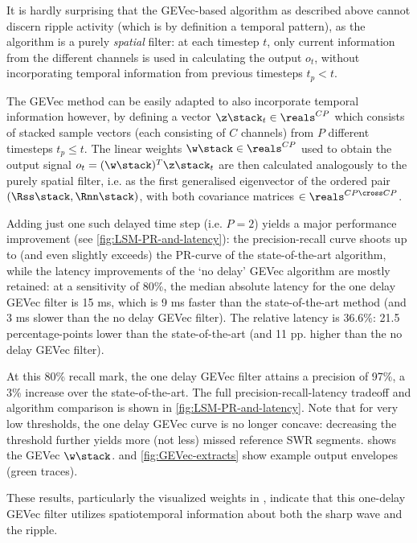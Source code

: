 \label{sec:spatiotemporal}

It is hardly surprising that the GEVec-based algorithm as described above cannot discern ripple activity (which is by definition a temporal pattern), as the algorithm is a purely \emph{spatial} filter: at each timestep $t$, only current information from the different channels is used in calculating the output $o_t$, without incorporating temporal information from previous timesteps $t_p < t$.

The GEVec method can be easily adapted to also incorporate temporal information however, by defining a vector $\z\stack_t \in \reals^{CP}$ which consists of stacked sample vectors (each consisting of $C$ channels) from $P$ different timesteps $t_p \leq t$. The linear weights $\w\stack \in \reals^{CP}$ used to obtain the output signal $o_t = (\w\stack)^T \z\stack_t$ are then calculated analogously to the purely spatial filter, i.e. as the first generalised eigenvector of the ordered pair $(\Rss\stack, \Rnn\stack)$, with both covariance matrices $\in \reals^{CP \cross CP}$.

Adding just one such delayed time step (i.e. $P = 2$) yields a major performance improvement (see \cref{fig:LSM-PR-and-latency}): the precision-recall curve shoots up to (and even slightly exceeds) the PR-curve of the state-of-the-art algorithm, while the latency improvements of the `no delay' GEVec algorithm are mostly retained: at a sensitivity of 80\%, the median absolute latency for the one delay GEVec filter is 15 ms, which is 9 ms faster than the state-of-the-art method (and 3 ms slower than the no delay GEVec filter). The relative latency is 36.6\%: 21.5 percentage-points lower than the state-of-the-art (and 11 pp. higher than the no delay GEVec filter).

At this 80\% recall mark, the one delay GEVec filter attains a precision of 97\%, a 3\% increase over the state-of-the-art. The full precision-recall-latency tradeoff and algorithm comparison is shown in \cref{fig:LSM-PR-and-latency}. Note that for very low thresholds, the one delay GEVec curve is no longer concave: decreasing the threshold further yields more (not less) missed reference SWR segments.  shows the GEVec $\w\stack$.  and \cref{fig:GEVec-extracts} show example output envelopes (green traces).

These results, particularly the visualized weights in , indicate that this one-delay GEVec filter utilizes spatiotemporal information about both the sharp wave and the ripple.
